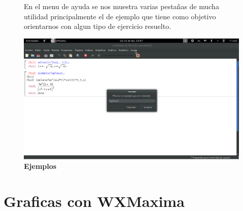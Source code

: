 \documentclass[10pt,a4paper]{book}
\begin{document}
\begin{small}
\begin{figure}[htb]
En el menu de ayuda se nos muestra varias pestañas de mucha utilidad principalmente el de ejemplo que tiene como objetivo orientarnos con algun tipo de ejercicio resuelto.
\begin{center}

\includegraphics[width=13cm]{fotos/cap12}
\caption{\textbf{Ejemplos}}
\end{center}
\end{figure}
\end{small}
\chapter{Graficas con WXMaxima}
\end{document}
